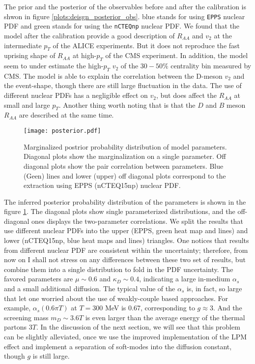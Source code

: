 The prior and the posterior of the observables before and after the calibration is shwon in figure \ref{plots:deisgn_posterior_obs}.
blue stands for using {\tt EPPS} nuclear PDF and green stands for using the {\tt nCTEQnp}  nuclear PDF.
We found that the model after the calibration provide a good description of $R_{AA}$ and $v_2$ at the intermediate $p_T$ of the ALICE experiments.
But it does not reproduce the fast uprising shape of $R_{AA}$ at high-$p_T$ of the CMS experiment.
In addition, the model seem to under estimate the high-$p_T$ $v_2$ of the $30-50\%$ centrality bin measured by CMS.
The model is able to explain the correlation between the D-meson $v_2$ and the event-shape, though there are still large fluctuation in the data.
The use of different nuclear PDFs has a negligible effect on $v_2$, but does affect the $R_{AA}$ at small and large $p_T$.
Another thing worth noting that is that the $D$ and $B$ meson $R_{AA}$ are described at the same time.

\begin{figure}
\centering
\texttt{[image: posterior.pdf]}
\caption{Marginalized postrior probability distribution of model parameters. Diagonal plots show the marginalization on a single parameter. Off diagonal plots show the pair correlation between parameters. Blue (Geen) lines and lower (upper) off diagonal plots correspond to the extraction using EPPS (nCTEQ15np) nuclear PDF.}\label{plots:posterior}
\end{figure}

The inferred posterior probability distribution of the parameters is shown in the figure \ref{plots:posterior}.
The diagonal plots show single parameterized distributions, and the off-diagonal ones displays the two-parameter correlations.
We split the results that use different nuclear PDFs into the upper (EPPS, green heat map and lines) and lower (nCTEQ15np, blue heat maps and lines) triangles.
One notices that results from different nuclear PDF are consistent within the uncertainty; therefore, from now on I shall not stress on any differences between these two set of results, but combine them into a single distribution to fold in the PDF uncertainty.
The favored parameters are $\mu \sim 0.6$ and $\kappa_D \sim 0.4$, indicating a large in-medium $\alpha_s$ and a small additional diffusion.
The typical value of the $\alpha_s$ is, in fact, so large that let one worried about the use of weakly-couple based approaches.
For example, $\alpha_s(0.6\pi T)$ at $T=300$ MeV is 0.67, corresponding to $g \approx 3$. 
And the screening mass $m_D \sim 3.6 T$ is even larger than the average energy of the thermal partons $3T$. 
In the discussion of the next section, we will see that this problem can be slightly alleviated, once we use the improved implementation of the LPM effect and implement a separation of soft-modes into the diffusion constant, though $g$ is still large.

